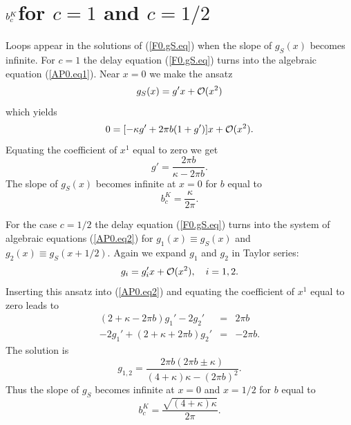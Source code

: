 \section{\protect\label{AP2}\protect\lowercase{$b_c^{\protect
   \uppercase{K}}$}for \protect\lowercase{$c=1$} and \protect
   \lowercase{$c=1/2$}}

Loops appear in the solutions of (\ref{F0.gS.eq}) when the slope of
$g_S(x)$ becomes infinite. For $c=1$ the delay equation
(\ref{F0.gS.eq}) turns into the algebraic equation (\ref{AP0.eq1}). 
Near $x=0$ we make the ansatz
\begin{equation}
  g_S(x)=g'x+{\cal O}(x^2)
  \label{AP2.ansatz}
\end{equation}
which yields
\begin{equation}
  0=[-\kappa g'+2\pi b(1+g')]x+{\cal O}(x^2).
\end{equation}
Equating the coefficient of $x^1$ equal to zero we get
\begin{equation}
  g'=\frac{2\pi b}{\kappa-2\pi b}.
  \label{AP2.gs}
\end{equation}
The slope of $g_S(x)$ becomes infinite at $x=0$ for $b$ equal to
\begin{equation}
  b_c^K=\frac{\kappa}{2\pi}.
  \label{AP2.bck1}
\end{equation}

For the case $c=1/2$ the delay equation (\ref{F0.gS.eq}) turns 
into the system of algebraic equations (\ref{AP0.eq2}) for
$g_1(x)\equiv g_S(x)$ and $g_2(x)\equiv g_S(x+1/2)$.  Again we expand
$g_1$ and $g_2$ in Taylor series:
\begin{equation}
  g_i=g_i'x+{\cal O}(x^2),\quad i=1,2.
  \label{AP2.ansatz2}
\end{equation}
Inserting this ansatz into (\ref{AP0.eq2}) and equating the
coefficient of $x^1$ equal to zero leads to
\begin{equation}\begin{array}{rcl}
  (2+\kappa-2\pi b)g_1'-2g_2'&=&2\pi b\\
  -2g_1'+(2+\kappa+2\pi b)g_2'&=&-2\pi b.
\end{array}
\label{AP2.eq3}
\end{equation}
The solution is
\begin{equation}
  g_{1,2}=\frac{2\pi b(2\pi b\pm\kappa)}{(4+\kappa)\kappa-(2\pi b)^2}.
  \label{AP2.g12}
\end{equation}
Thus the slope of $g_S$ becomes infinite at $x=0$ and $x=1/2$ for 
$b$ equal to
\begin{equation}
  b_c^K=\frac{\sqrt{(4+\kappa)\kappa}}{2\pi}.
  \label{AP2.bck2}
\end{equation}

